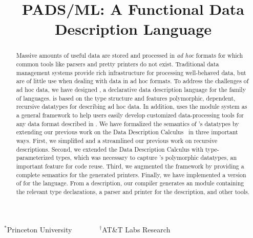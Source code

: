 \documentclass[nocopyrightspace]{sigplanconf}
\begin{document}
\title{PADS/ML: A Functional Data Description Language}
{$^\ast$Princeton University \ \ \ \ \ \ \ $^\dagger$AT\&T Labs Research}
 { \ \ \ \ }



\maketitle{}

\begin{abstract}  

  Massive amounts of useful data are stored and processed in
  \textit{ad hoc} formats for which common tools like parsers and
  pretty printers do not exist.  Traditional data management systems
  provide rich infrastructure for processing well-behaved data, but
  are of little use when dealing with data in ad hoc formats.  To
  address the challenges of ad hoc data, we have designed \padsml{}, a
  declarative data description language for the \ml{} family of
  languages.  \padsml{} is based on the \ml{} type structure and
  features polymorphic, dependent, recursive datatypes for describing
  ad hoc data.  In addition, \padsml{} uses the \ml{} module system as
  a general framework to help users easily develop customized
  data-processing tools for any data format described in \padsml{}.
  We have formalized the semantics of \padsml{}'s datatypes by
  extending our previous work on the Data Description
  Calculus~\cite{fisher+:next700ddl} in three important ways.
  First, we simplified and a streamlined our previous work on recursive 
  descriptions.  Second, we extended the Data Description Calculus
  with type-parameterized types, which was necessary to capture
  \padsml{}'s polymorphic datatypes, an important feature for code reuse.
  Third, we augmented the framework by providing a complete semantics
  for the generated printers.  Finally, we
  have implemented a version of \padsml{} for the \ocaml{} language.
  From a \padsml{} description, our compiler generates an \ocaml{}
  module containing the relevant type declarations, a parser and printer
  for the description, and other tools.

\end{abstract}




\end{document}
